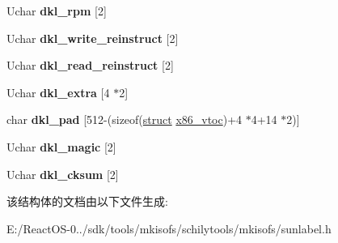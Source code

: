 \begin{DoxyCompactItemize}
Uchar {\bfseries dkl\+\_\+rpm} \mbox{[}2\mbox{]}
\item 
\mbox{\label{structx86__label_ad8fb6f4f0ddde5f9189009f80a34213d}} 
Uchar {\bfseries dkl\+\_\+write\+\_\+reinstruct} \mbox{[}2\mbox{]}
\item 
\mbox{\label{structx86__label_a998f074bd8ff2a188f7521a9d6ac6d7d}} 
Uchar {\bfseries dkl\+\_\+read\+\_\+reinstruct} \mbox{[}2\mbox{]}
\item 
\mbox{\label{structx86__label_a5064ff13910b13771598a30708e32c3c}} 
Uchar {\bfseries dkl\+\_\+extra} \mbox{[}4 $\ast$2\mbox{]}
\item 
\mbox{\label{structx86__label_a92378de534398fff07628518c6e2ff22}} 
char {\bfseries dkl\+\_\+pad} \mbox{[}512-\/(sizeof(\hyperlink{interfacestruct}{struct} \hyperlink{structx86__label_1_1x86__vtoc}{x86\+\_\+vtoc})+4 $\ast$4+14 $\ast$2)\mbox{]}
\item 
\mbox{\label{structx86__label_a7d3527685236aead74aad08476f8eb52}} 
Uchar {\bfseries dkl\+\_\+magic} \mbox{[}2\mbox{]}
\item 
\mbox{\label{structx86__label_a55aaa63059df769b11b3ae51800a8f62}} 
Uchar {\bfseries dkl\+\_\+cksum} \mbox{[}2\mbox{]}
\end{DoxyCompactItemize}


该结构体的文档由以下文件生成\+:\begin{DoxyCompactItemize}
\item 
E\+:/\+React\+O\+S-\/0../sdk/tools/mkisofs/schilytools/mkisofs/sunlabel.\+h\end{DoxyCompactItemize}
